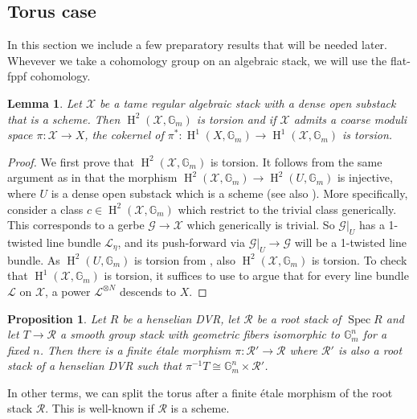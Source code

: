 \documentclass{amsart}
\newtheorem{lemma}[lemma]{Lemma}
\newtheorem{proposition}[proposition]{Proposition}
\theoremstyle{definition}
\newcommand{\bG}{\mathbb{G}}
\newcommand{\cG}{\mathcal{G}}
\newcommand{\cX}{\mathcal{X}}
\newcommand{\oH}{\operatorname{H}}
\newcommand{\cL}{\mathcal{L}}
\newcommand{\cR}{\mathcal{R}}
\newcommand{\spec}{\operatorname{Spec}}
\newcommand{\Gm}{\mathbb{G}_m}
\begin{document}
\subsection{Torus case}
In this section we include a few preparatory results that will be needed later. Whevever we take a cohomology group on an algebraic stack, we will use the flat-fppf cohomology.
\begin{lemma}\label{lemma_torsion_torus_cohom}Let $\cX$ be a tame regular algebraic stack with a dense open substack that is a scheme. Then $\oH^2(\cX,\Gm)$ is torsion and if $\cX$ admits a coarse moduli space $\pi: \cX\to X$, the cokernel of $\pi^*: \oH^1(X, \bG_m) \to \oH^1(\cX, \bG_m)$ is torsion.
\end{lemma}
\begin{proof}
 We first prove that $\oH^2(\cX,\Gm)$ is torsion. It follows from the same argument as in \cite[Proposition 3.1.3.3]{lieblich2008twisted} that the morphism $\oH^2(\cX,\Gm)\to \oH^2(U,\Gm)$ is injective, where $U$ is a dense open substack which is a scheme (see also \cite[Prop. 2.23]{achenjang}). More specifically, consider a class $c\in \oH^2(\cX,\Gm)$ which restrict to the trivial class generically. This corresponds to a gerbe $\cG\to \cX$ which generically is trivial. So $\cG|_U$ has a 1-twisted line bundle $\cL_\eta$, and its push-forward via $\cG|_U\to \cG$ will be a 1-twisted line bundle. As $\oH^2(U,\Gm)$ is torsion from \cite[Corollary 3.1.3.4]{lieblich2008twisted}, also $\oH^2(\cX,\Gm)$ is torsion. To check that $\oH^1(\cX,\Gm)$ is torsion, it suffices to use \cite[Lemma 2.3.7]{abramovich2011stable} to argue that for every line bundle $\cL$ on $\cX$, a power $\cL^{\otimes N}$ descends to $X$. 
\end{proof}
\begin{proposition}\label{prop_there_is_fet_that_splits_the_torus}
    Let $R$ be a henselian DVR, let $\cR$ be a root stack of $\spec R$ and let $T\to \cR$ a smooth group stack with geometric fibers isomorphic to $\Gm^n$ for a fixed $n$. Then there is a finite \'etale morphism $\pi:\cR'\to \cR$ where $\cR'$ is also a root stack of a henselian DVR such that $\pi^{-1}T\cong \bG_m^n\times \cR'$.
\end{proposition}
In other terms, we can split the torus after a finite \'etale morphism of the root stack $\cR$. This is well-known if $\cR$ is a scheme.
\end{document}
